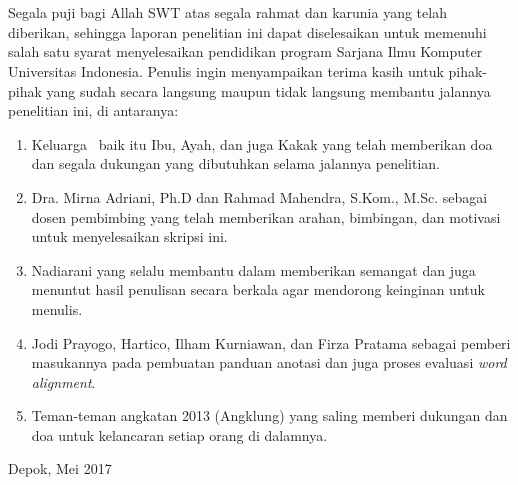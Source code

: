 \chapter*{\kataPengantar}

Segala puji bagi Allah SWT atas segala rahmat dan karunia yang telah diberikan, sehingga laporan penelitian ini dapat diselesaikan untuk memenuhi salah satu syarat menyelesaikan pendidikan program Sarjana Ilmu Komputer Universitas Indonesia. Penulis ingin menyampaikan terima kasih untuk pihak-pihak yang sudah secara langsung maupun tidak langsung membantu jalannya penelitian ini, di antaranya:

\begin{enumerate}
	\item Keluarga \saya~baik itu Ibu, Ayah, dan juga Kakak yang telah memberikan doa dan segala dukungan yang dibutuhkan selama jalannya penelitian.
	\item Dra. Mirna Adriani, Ph.D dan Rahmad Mahendra, S.Kom., M.Sc. sebagai dosen pembimbing yang telah memberikan arahan, bimbingan, dan motivasi untuk menyelesaikan skripsi ini.
	\item Nadiarani yang selalu membantu dalam memberikan semangat dan juga menuntut hasil penulisan secara berkala agar mendorong keinginan untuk menulis.
	\item Jodi Prayogo, Hartico, Ilham Kurniawan, dan Firza Pratama sebagai pemberi masukannya pada pembuatan panduan anotasi dan juga proses evaluasi \textit{word alignment}.
	\item Teman-teman angkatan 2013 (Angklung) yang saling memberi dukungan dan doa untuk kelancaran setiap orang di dalamnya.
	
	
\end{enumerate}
\vspace*{0.1cm}
\begin{flushright}
	Depok, Mei 2017\\[0.1cm]
	\vspace*{1cm}
	\penulis
	
\end{flushright}
